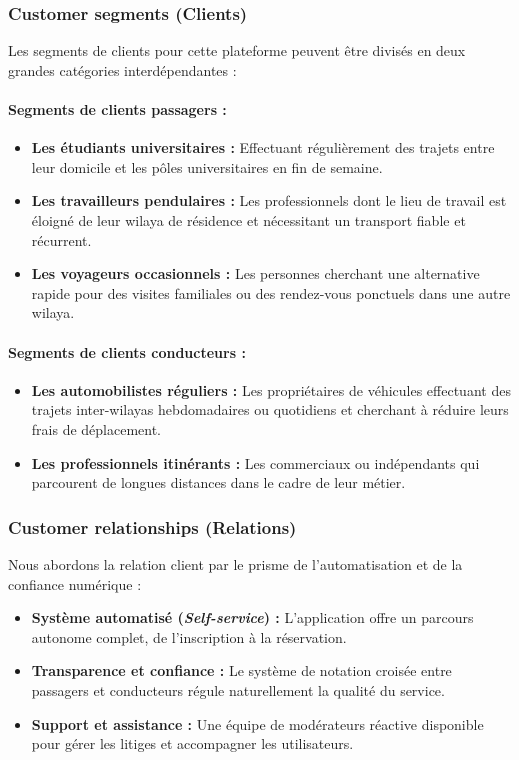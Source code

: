 \subsubsection{Customer segments (Clients)}

Les segments de clients pour cette plateforme peuvent être divisés en deux grandes catégories interdépendantes :

\paragraph{Segments de clients passagers :}
\begin{itemize}
    \item \textbf{Les étudiants universitaires :} Effectuant régulièrement des trajets entre leur domicile et les pôles universitaires en fin de semaine.
    \item \textbf{Les travailleurs pendulaires :} Les professionnels dont le lieu de travail est éloigné de leur wilaya de résidence et nécessitant un transport fiable et récurrent.
    \item \textbf{Les voyageurs occasionnels :} Les personnes cherchant une alternative rapide pour des visites familiales ou des rendez-vous ponctuels dans une autre wilaya.
\end{itemize}

\paragraph{Segments de clients conducteurs :}
\begin{itemize}
    \item \textbf{Les automobilistes réguliers :} Les propriétaires de véhicules effectuant des trajets inter-wilayas hebdomadaires ou quotidiens et cherchant à réduire leurs frais de déplacement.
    \item \textbf{Les professionnels itinérants :} Les commerciaux ou indépendants qui parcourent de longues distances dans le cadre de leur métier.
\end{itemize}

\subsubsection{Customer relationships (Relations)}

Nous abordons la relation client par le prisme de l'automatisation et de la confiance numérique :
\begin{itemize}
    \item \textbf{Système automatisé (\textit{Self-service}) :} L'application offre un parcours autonome complet, de l'inscription à la réservation.
    \item \textbf{Transparence et confiance :} Le système de notation croisée entre passagers et conducteurs régule naturellement la qualité du service.
    \item \textbf{Support et assistance :} Une équipe de modérateurs réactive disponible pour gérer les litiges et accompagner les utilisateurs.
\end{itemize}

